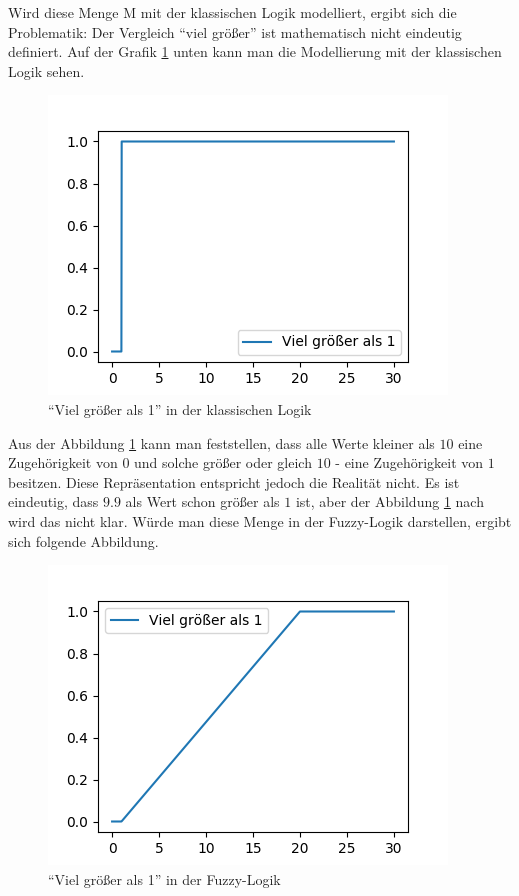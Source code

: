Wird diese Menge M mit der klassischen Logik modelliert, ergibt sich die Problematik: Der Vergleich ``viel größer'' ist mathematisch nicht eindeutig definiert. Auf der Grafik \ref{class_dar} unten kann man die Modellierung mit der klassischen Logik sehen.


\begin{figure}[htbp]
	\centering
	\includegraphics[scale=0.5]{images/classic_logic.png}
	\caption{``Viel größer als 1'' in der klassischen Logik}\label{class_dar}
\end{figure}

Aus der Abbildung \ref{class_dar} kann man feststellen, dass alle Werte kleiner als $10$ eine Zugehörigkeit von $0$ und solche größer oder gleich $10$ - eine Zugehörigkeit von $1$ besitzen. Diese Repräsentation entspricht jedoch die Realität nicht. Es ist eindeutig, dass $9.9$ als Wert schon größer als $1$ ist, aber der Abbildung \ref{class_dar} nach wird das nicht klar. Würde man diese Menge in der Fuzzy-Logik darstellen, ergibt sich folgende Abbildung.

\begin{figure}[htbp]
	\centering
	\includegraphics[scale=0.5]{images/fuzz_logic.png}
	\caption{``Viel größer als 1'' in der Fuzzy-Logik}\label{fuzzy_dar}
\end{figure}

